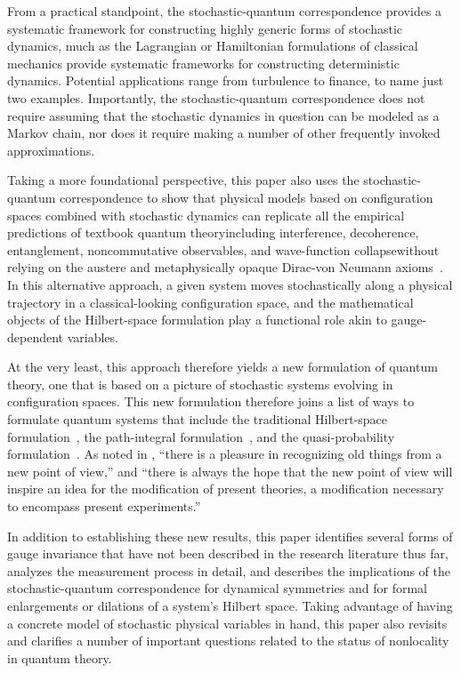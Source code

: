 \documentclass[12pt,english,prl,superscriptaddress,nobibnotes,nofootinbib]{revtex4-2}
\begin{document}
From a practical standpoint, the stochastic-quantum correspondence
provides a systematic framework for constructing highly generic forms
of stochastic dynamics, much as the Lagrangian or Hamiltonian formulations
of classical mechanics provide systematic frameworks for constructing
deterministic dynamics. Potential applications range from turbulence
to finance, to name just two examples. Importantly, the stochastic-quantum
correspondence does not require assuming that the stochastic dynamics
in question can be modeled as a Markov chain, nor does it require
making a number of other frequently invoked approximations. 

Taking a more foundational perspective, this paper also uses the stochastic-quantum
correspondence to show that physical models based on configuration
spaces combined with stochastic dynamics can replicate all the empirical
predictions of textbook quantum theory\textemdash including interference,
decoherence, entanglement, noncommutative observables, and wave-function
collapse\textemdash without relying on the austere and metaphysically
opaque Dirac-von Neumann axioms~\citep{Dirac:1930pofm,vonNeumann:1932mgdq}.
In this alternative approach, a given system moves stochastically
along a physical trajectory in a classical-looking configuration space,
 and the mathematical objects of the Hilbert-space formulation play
a functional role akin to gauge-dependent variables.

At the very least, this approach therefore yields a new formulation
of quantum theory, one that is based on a picture of stochastic systems
evolving in configuration spaces. This new formulation therefore joins
a list of ways to formulate quantum systems that include the traditional
Hilbert-space formulation~\citep{Dirac:1930pofm,vonNeumann:1932mgdq},
the path-integral formulation~\citep{Dirac:1933tliqm,Feynman:1942tpolaiqm,Feynman:1948statnrqm},
and the quasi-probability formulation~\citep{Wigner:1932otqcfte,Moyal:1949qmaast}.
As noted in \citep{Feynman:1948statnrqm}, ``there is a pleasure
in recognizing old things from a new point of view,'' and ``there
is always the hope that the new point of view will inspire an idea
for the modification of present theories, a modification necessary
to encompass present experiments.''

In addition to establishing these new results, this paper identifies
several forms of gauge invariance that have not been described in
the research literature thus far, analyzes the measurement process
in detail, and describes the implications of the stochastic-quantum
correspondence for dynamical symmetries and for formal enlargements
or dilations of a system's Hilbert space. Taking advantage of having
a concrete model of stochastic physical variables in hand, this paper
also revisits and clarifies a number of important questions related
to the status of nonlocality in quantum theory.
\end{document}
